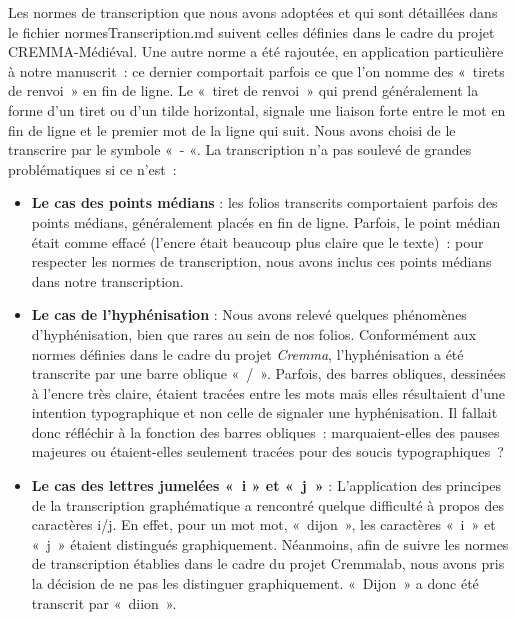 \documentclass[12pt,a4paper,oneside,titlepage]{article} %
\begin{document}
	Les normes de transcription que nous avons adoptées et qui sont détaillées dans le fichier normesTranscription.md suivent celles définies dans le cadre du projet CREMMA-Médiéval. Une autre norme a été rajoutée, en application particulière à notre manuscrit : ce dernier comportait parfois ce que l’on nomme des « tirets de renvoi » en fin de ligne. Le « tiret de renvoi » qui prend  généralement la forme d’un tiret ou d’un tilde horizontal, signale une liaison forte entre le mot en fin de ligne et  le premier mot de la ligne qui suit. Nous avons choisi de le transcrire par le symbole « - «.  
	La transcription n’a pas soulevé de grandes problématiques si ce n’est :
	\begin{itemize}
		\item \textbf{Le cas des points médians} :  les folios transcrits comportaient parfois des points médians, généralement placés en fin de ligne. Parfois, le point médian était comme effacé (l’encre était beaucoup plus claire que le texte) : pour respecter les normes de transcription, nous avons inclus ces points médians dans notre transcription.
		
		\item
		\textbf{Le cas de l’hyphénisation }: 
		Nous avons relevé quelques phénomènes d’hyphénisation, bien que rares au sein de nos folios. Conformément aux normes définies dans le cadre du projet \emph{Cremma}, l’hyphénisation a été transcrite par une barre oblique « / ». Parfois, des barres obliques, dessinées à l’encre très claire, étaient tracées entre les mots mais elles résultaient d’une intention typographique et non celle de signaler une hyphénisation. Il fallait donc réfléchir à la fonction des barres obliques : marquaient-elles des pauses majeures ou étaient-elles seulement tracées pour des soucis typographiques ? \\
		
		\item
		\textbf{Le cas des lettres jumelées « i » et « j »} : 
		L’application des principes de la transcription graphématique a rencontré quelque difficulté à propos des caractères i/j. En effet, pour un mot mot, « dijon », les caractères « i » et « j » étaient distingués graphiquement. Néanmoins, afin de suivre les normes de transcription établies dans le cadre du projet Cremmalab, nous avons pris la décision de ne pas les distinguer graphiquement. « Dijon » a donc été transcrit par « diion ».\\
		
	\end{itemize}
	
\end{document}
